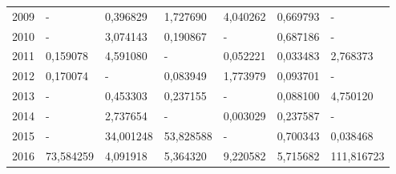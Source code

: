 \begin{table}
\begin{tabular}{p{1cm}p{2cm}p{2cm}p{2cm}p{2cm}p{2cm}p{2cm}}
 2009 &                           - &                                    0,396829 &                                      1,727690 &                        4,040262 &                           0,669793 &                 - \\
 2010 &                           - &                                    3,074143 &                                      0,190867 &                               - &                           0,687186 &                 - \\
 2011 &                    0,159078 &                                    4,591080 &                                             - &                        0,052221 &                           0,033483 &          2,768373 \\
 2012 &                    0,170074 &                                           - &                                      0,083949 &                        1,773979 &                           0,093701 &                 - \\
 2013 &                           - &                                    0,453303 &                                      0,237155 &                               - &                           0,088100 &          4,750120 \\
 2014 &                           - &                                    2,737654 &                                             - &                        0,003029 &                           0,237587 &                 - \\
 2015 &                           - &                                   34,001248 &                                     53,828588 &                               - &                           0,700343 &          0,038468 \\
 2016 &                   73,584259 &                                    4,091918 &                                      5,364320 &                        9,220582 &                           5,715682 &        111,816723 \\
\bottomrule
\end{tabular}
\end{table}
